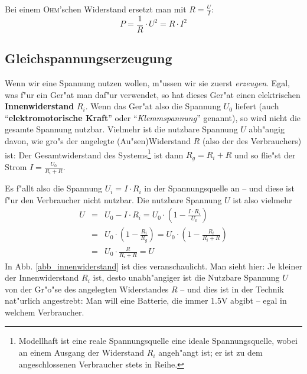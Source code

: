 Bei einem \textsc{Ohm}'schen Widerstand ersetzt man mit $R = \frac{U}{I}$:
\begin{equation}
   \label{eqn_differenz-c84}
   P = \frac{1}{R} \cdot U^2 = R \cdot I^2
\end{equation}








\subsection{Gleichspannungserzeugung}
\label{kap_gleichspannungserzeugung}

Wenn wir eine Spannung nutzen wollen, m"ussen wir sie zuerst
\emph{erzeugen}. Egal, was f"ur ein Ger"at man daf"ur verwendet, so hat
dieses Ger"at einen elektrischen
\textbf{Innenwiderstand} $R_i$. Wenn das Ger"at
also die Spannung $U_0$ liefert (auch
"`\textbf{elektromotorische
  Kraft}"' oder "`\emph{Klemmspannung}"'
genannt), so wird nicht die gesamte Spannung nutzbar. Vielmehr ist die
nutzbare Spannung $U$ abh"angig davon, wie gro"s der angelegte
(Au"sen)Widerstand $R$ (also der des Verbrauchers) ist: Der
Gesamtwiderstand des Systems\footnote{Modellhaft ist eine reale
  Spannungsquelle eine ideale Spannungsquelle, wobei an einem Ausgang
  der Widerstand $R_i$ angeh"angt ist; er ist zu dem angeschlossenen
  Verbraucher stets in Reihe.} ist dann $R_g = R_i + R$ und so flie"st
der Strom $I = \frac{U_0}{R_i + R}$.

Es f"allt also die Spannung $U_i = I \cdot R_i$ in der Spannungsquelle
an -- und diese ist f"ur den Verbraucher nicht nutzbar. Die nutzbare
Spannung $U$ ist also vielmehr
\begin{eqnarray}
\nonumber
   U &=&
 U_0 - I \cdot R_i
=
U_0 \cdot \left ( 1 - \frac{I \cdot  R_i}{U_0} \right )\\
\nonumber
&=&
U_0 \cdot \left ( 1 - \frac{ R_i}{R_g} \right )
=
U_0 \cdot \left ( 1 - \frac{ R_i}{R_i + R} \right )\\
   \label{eqn_differenz-c85}
&=&
\boxed{ U_0 \cdot  \frac{R}{R_i + R}  = U}
\end{eqnarray}
In Abb. \ref{abb_innenwiderstand} ist dies veranschaulicht. Man sieht
hier: Je kleiner der Innenwiderstand $R_i$ ist, desto unabh"angiger ist
die Nutzbare Spannung $U$ von der Gr"o"se des angelegten Widerstandes
$R$ -- und dies ist in der Technik nat"urlich angestrebt: Man will eine
Batterie, die immer 1.5V abgibt -- egal in welchem Verbraucher.

